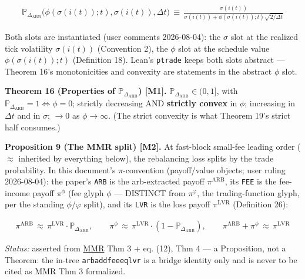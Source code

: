 \documentclass[11pt]{article}
\renewcommand{\_}{\textunderscore\allowbreak}
\begin{document}
\[
    \begin{aligned}
        \mathbb{P}_{\Delta_{\text{ARB}}}\big(\phi(\sigma(i(t));t),\sigma(i(t)),\Delta t\big) \, \equiv \, \frac{\sigma(i(t))}{\sigma(i(t)) + \phi(\sigma(i(t));t)\sqrt{2/\Delta t}}
    \end{aligned}
\]

Both slots are instantiated (user comments 2026-08-04): the \(\sigma\) slot at the realized tick volatility \(\sigma(i(t))\) (Convention 2), the \(\phi\) slot at the schedule value \(\phi(\sigma(i(t));t)\) (Definition 18). Lean's \texttt{ptrade} keeps both slots abstract --- Theorem 16's monotonicities and convexity are statements in the abstract \(\phi\) slot.

\textbf{Theorem 16 (Properties of \(\mathbb{P}_{\Delta_{\text{ARB}}}\)) {[}M1{]}.} \(\mathbb{P}_{\Delta_{\text{ARB}}} \in (0,1]\), with \(\mathbb{P}_{\Delta_{\text{ARB}}} = 1 \iff \phi = 0\); strictly decreasing AND \textbf{strictly convex} in \(\phi\); increasing in \(\Delta t\) and in \(\sigma\); \(\to 0\) as \(\phi \to \infty\). (The strict convexity is what Theorem 19's strict half consumes.)

\textbf{Proposition 9 (The MMR split) {[}M2{]}.} At fast-block small-fee leading order (\(\approx\) inherited by everything below), the rebalancing loss splits by the trade probability. In this document's \(\pi\)-convention (payoff/value objects; user ruling 2026-08-04): the paper's \texttt{ARB} is the arb-extracted payoff \(\pi^{\text{ARB}}\), its \texttt{FEE} is the fee-income payoff \(\pi^{\phi}\) (fee glyph \(\phi\) --- DISTINCT from \(\pi^{\varphi}\), the trading-function glyph, per the standing \(\phi\)/\(\varphi\) split), and its \texttt{LVR} is the loss payoff \(\pi^{\mathrm{LVR}}\) (Definition 26):

\[
    \begin{aligned}
        \pi^{\text{ARB}} \, \approx \, \pi^{\mathrm{LVR}}\cdot \mathbb{P}_{\Delta_{\text{ARB}}}, \qquad
        \pi^{\phi} \, \approx \, \pi^{\mathrm{LVR}}\cdot(1-\mathbb{P}_{\Delta_{\text{ARB}}}), \qquad
        \pi^{\text{ARB}}+\pi^{\phi} \, \approx \, \pi^{\mathrm{LVR}}
    \end{aligned}
\]

\emph{Status:} asserted from \href{../refs/mev/MilionisMoallemiRoughgardenArbProfitsFees.pdf}{MMR} Thm 3 + eq. (12), Thm 4 --- a Proposition, not a Theorem: the in-tree \texttt{arb\_add\_fee\_eq\_lvr} is a bridge identity only and is never to be cited as MMR Thm 3 formalized.
\end{document}
